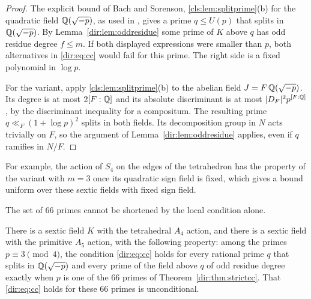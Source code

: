 \begin{proof}
The explicit bound of Bach and Sorenson, \cref{cls:lem:splitprime}(b) for the quadratic
field $\mathbb{Q}(\sqrt{-p})$, as used in \cite[Appendix~A]{BanwaitDerickx2023Towards}, gives a
prime $q\le U(p)$ that splits in $\mathbb{Q}(\sqrt{-p})$.
By Lemma~\ref{dir:lem:oddresidue} some prime of $K$ above $q$ has odd residue degree
$f\le m$. If both displayed expressions were smaller than $p$, both alternatives in
\eqref{dir:eq:cc} would fail for this prime. The right side is a fixed polynomial in
$\log p$.

For the variant, apply \cref{cls:lem:splitprime}(b) to the abelian field
$J=F\,\mathbb{Q}(\sqrt{-p})$. Its degree is at most $2[F:\mathbb{Q}]$ and its absolute discriminant
is at most $\lvert D_F\rvert^2p^{[F:\mathbb{Q}]}$, by the discriminant inequality for a compositum.
The resulting prime $q\ll_F(1+\log p)^2$ splits in both fields. Its decomposition
group in $N$ acts trivially on $F$, so the argument of Lemma~\ref{dir:lem:oddresidue}
applies, even if $q$ ramifies in $N/F$.
\end{proof}

For example, the action of $S_4$ on the edges of the tetrahedron has the property of
the variant with $m=3$ once its quadratic sign field is fixed, which gives a bound
uniform over these sextic fields with fixed sign field.

The set of $66$ primes cannot be shortened by the local condition alone.

\begin{theorem}\label{dir:thm:isogenysharp}
There is a sextic field $K$ with the tetrahedral $A_4$ action, and there is a sextic
field with the primitive $A_5$ action, with the following property: among the primes
$p\equiv3\pmod4$, the condition \eqref{dir:eq:cc} holds for every rational prime $q$
that splits in $\mathbb{Q}(\sqrt{-p})$ and every prime of the field above $q$ of odd residue
degree exactly when $p$ is one of the $66$ primes of Theorem~\ref{dir:thm:strictcc}. That
\eqref{dir:eq:cc} holds for these $66$ primes is unconditional.
\end{theorem}

